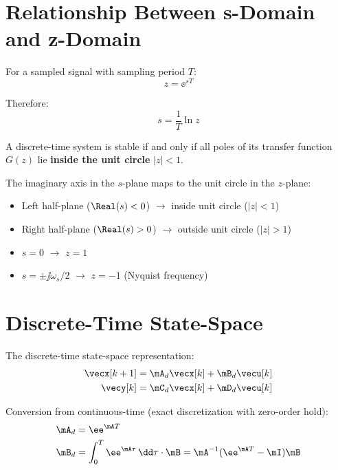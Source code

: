 \section{Relationship Between s-Domain and z-Domain}

For a sampled signal with sampling period $T$:
\begin{equation}
z = \ee^{sT}
\end{equation}

Therefore:
\begin{equation}
s = \frac{1}{T}\ln z
\end{equation}

\begin{keyconceptbox}[title=Stability in z-Domain]
A discrete-time system is stable if and only if all poles of its transfer function $G(z)$ lie \textbf{inside the unit circle} $|z| < 1$.
\end{keyconceptbox}

The imaginary axis in the $s$-plane maps to the unit circle in the $z$-plane:
\begin{itemize}
    \item Left half-plane ($\Real(s) < 0$) $\to$ inside unit circle ($|z| < 1$)
    \item Right half-plane ($\Real(s) > 0$) $\to$ outside unit circle ($|z| > 1$)
    \item $s = 0$ $\to$ $z = 1$
    \item $s = \pm\jj\omega_s/2$ $\to$ $z = -1$ (Nyquist frequency)
\end{itemize}

\section{Discrete-Time State-Space}

The discrete-time state-space representation:
\begin{align}
\vecx[k+1] &= \mA_d\vecx[k] + \mB_d\vecu[k] \\
\vecy[k] &= \mC_d\vecx[k] + \mD_d\vecu[k]
\end{align}

Conversion from continuous-time (exact discretization with zero-order hold):
\begin{align}
\mA_d &= \ee^{\mA T} \\
\mB_d &= \int_0^T \ee^{\mA\tau}\,\dd\tau \cdot \mB = \mA^{-1}(\ee^{\mA T} - \mI)\mB
\end{align}

